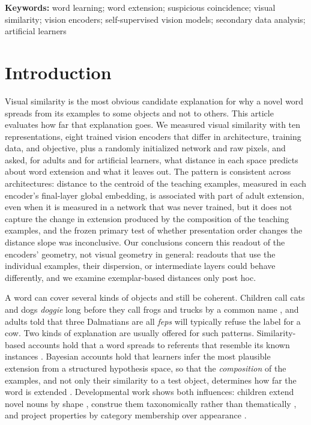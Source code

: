 \documentclass[11pt]{article}
\begin{document}
\begin{abstract}
across architectures, even without training, but does not capture the effect of example composition; in post hoc checks, distances to the individual examples did not capture it either. Analyses followed internal plans fixed before the confirmatory runs (not externally preregistered).
\end{abstract}

\vspace{-0.6em}
\noindent\textbf{Keywords:} word learning; word extension; suspicious coincidence; visual similarity; vision encoders; self-supervised vision models; secondary data analysis; artificial learners

\section{Introduction}

Visual similarity is the most obvious candidate explanation for why a novel word spreads from its examples to some objects and not to others. This article evaluates how far that explanation goes. We measured visual similarity with ten representations, eight trained vision encoders that differ in architecture, training data, and objective, plus a randomly initialized network and raw pixels, and asked, for adults and for artificial learners, what distance in each space predicts about word extension and what it leaves out. The pattern is consistent across architectures: distance to the centroid of the teaching examples, measured in each encoder's final-layer global embedding, is associated with part of adult extension, even when it is measured in a network that was never trained, but it does not capture the change in extension produced by the composition of the teaching examples, and the frozen primary test of whether presentation order changes the distance slope was inconclusive. Our conclusions concern this readout of the encoders' geometry, not visual geometry in general: readouts that use the individual examples, their dispersion, or intermediate layers could behave differently, and we examine exemplar-based distances only post hoc.

A word can cover several kinds of objects and still be coherent. Children call cats and dogs \emph{doggie} long before they call frogs and trucks by a common name \parencite{rescorla1980}, and adults told that three Dalmatians are all \emph{feps} will typically refuse the label for a cow. Two kinds of explanation are usually offered for such patterns. Similarity-based accounts hold that a word spreads to referents that resemble its known instances \parencite{sloutsky2004,nosofsky1986}. Bayesian accounts hold that learners infer the most plausible extension from a structured hypothesis space, so that the \emph{composition} of the examples, and not only their similarity to a test object, determines how far the word is extended \parencite{xu2007}. Developmental work shows both influences: children extend novel nouns by shape \parencite{landau1988}, construe them taxonomically rather than thematically \parencite{markman1984}, and project properties by category membership over appearance \parencite{gelman1986}.
\end{document}
